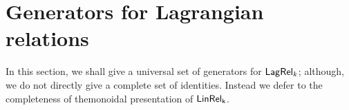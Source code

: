 \section{Generators for Lagrangian relations}
\label{sec:univ}

%

In this section, we shall give a universal set of generators for $\mathsf{Lag}\mathsf{Rel}_k$; although, we do not directly give a complete set of identities.  Instead we defer to the completeness of themonoidal presentation of $\sf LinRel_k$.


